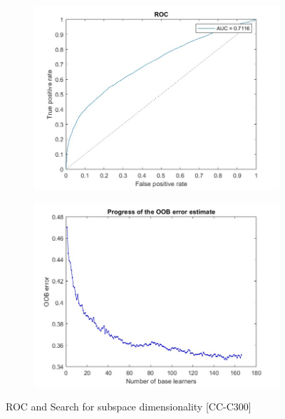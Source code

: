 \begin{figure}[H]
    \begin{subfigure}[b]{0.5\textwidth}
        \includegraphics[width=\textwidth]{img/ROC300.jpg}
    \end{subfigure}
    \hfill
    \begin{subfigure}[b]{0.5\textwidth}
        \includegraphics[width=\textwidth]{img/saturation300.jpg}
    \end{subfigure}
    \caption{ROC and Search for subspace dimensionality [CC-C300]}
\end{figure}
